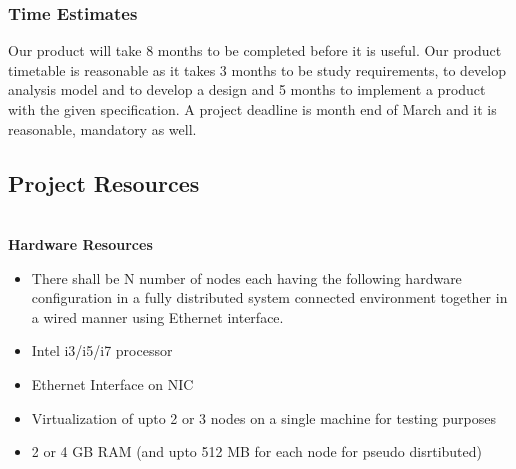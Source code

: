 \documentclass[oneside,a4paper,12pt]{report}
\begin{document}
\subsubsection{Time Estimates}
Our product will take 8 months to be completed before it is useful. Our product timetable is reasonable as it takes 3 months to be study requirements, to develop analysis model and to develop a design and 5 months to implement a product with the given specification. A project deadline is month end of March and it is reasonable, mandatory as well.


\subsection{Project Resources}
\textbf{ \\ Hardware Resources}
\begin{itemize}
\item There shall be N number of nodes each having the following hardware configuration in a fully distributed system connected environment together in a wired manner using Ethernet interface.
\item Intel i3/i5/i7 processor
\item Ethernet Interface on NIC
\item Virtualization of upto 2 or 3 nodes on a single machine for testing purposes
\item 2 or 4 GB RAM (and upto 512 MB for each node for pseudo disrtibuted) \\[3ex]
\end{itemize}
\end{document}
